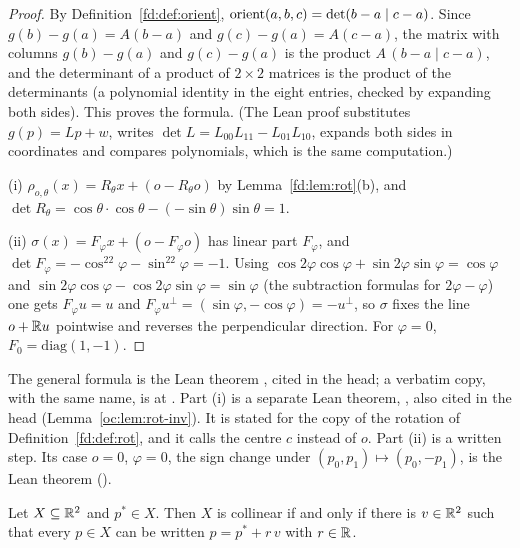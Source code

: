 \begin{proof}
By Definition~\ref{fd:def:orient}, $\operatorname{orient}(a,b,c)=\det(b-a\mid c-a)$. Since $g(b)-g(a)=A(b-a)$ and
$g(c)-g(a)=A(c-a)$, the matrix with columns $g(b)-g(a)$ and $g(c)-g(a)$ is the product $A\,(b-a\mid c-a)$,
and the determinant of a product of $2\times2$ matrices is the product of the determinants (a polynomial
identity in the eight entries, checked by expanding both sides). This proves the formula. (The Lean proof
substitutes $g(p)=Lp+w$, writes $\det L=L_{00}L_{11}-L_{01}L_{10}$, expands both sides in coordinates
and compares polynomials, which is the same computation.)

(i) $\rho_{o,\theta}(x)=R_\theta x+(o-R_\theta o)$ by Lemma~\ref{fd:lem:rot}(b), and
$\det R_\theta=\cos\theta\cdot\cos\theta-(-\sin\theta)\sin\theta=1$.

(ii) $\sigma(x)=F_\varphi x+(o-F_\varphi o)$ has linear part $F_\varphi$, and
$\det F_\varphi=-\cos^22\varphi-\sin^22\varphi=-1$. Using $\cos2\varphi\cos\varphi+\sin2\varphi\sin\varphi
=\cos\varphi$ and $\sin2\varphi\cos\varphi-\cos2\varphi\sin\varphi=\sin\varphi$ (the subtraction formulas for
$2\varphi-\varphi$) one gets $F_\varphi u=u$ and $F_\varphi u^\perp=(\sin\varphi,-\cos\varphi)=-u^\perp$, so
$\sigma$ fixes the line $o+\mathbb R u$ pointwise and reverses the perpendicular direction. For $\varphi=0$,
$F_0=\mathrm{diag}(1,-1)$.
\end{proof}

\begin{remark}\label{fd:rem:affine-orient-lean}\sloppy
The general formula is the Lean theorem , cited in the
head; a verbatim copy, with the same name, is at .
Part (i) is a separate Lean theorem, , also
cited in the head (Lemma~\ref{oc:lem:rot-inv}). It is stated for the copy
 of the rotation of Definition~\ref{fd:def:rot}, and it
calls the centre $c$ instead of $o$. Part (ii) is a written step. Its case $o=0$, $\varphi=0$, the sign
change under $(p_0,p_1)\mapsto(p_0,-p_1)$, is the Lean theorem 
().
\end{remark}

\begin{lemma}\label{fd:lem:collinear-mem}
Let $X\subseteq\mathbb R^2$ and $p^*\in X$. Then $X$ is collinear if and only if there is $v\in\mathbb R^2$ such that
every $p\in X$ can be written $p=p^*+r\,v$ with $r\in\mathbb R$.
\end{lemma}

